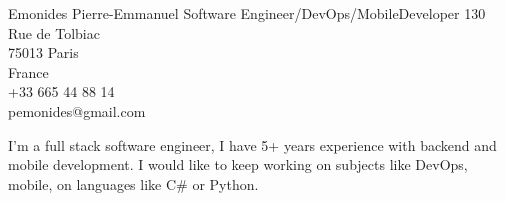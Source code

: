 \documentclass{emonides-cv}
\begin{document}
  
  {Emonides} {Pierre-Emmanuel}
  {Software Engineer/DevOps/MobileDeveloper}
  { 130 Rue de Tolbiac\\
    75013 Paris\\
    France\\
    +33 665 44 88 14\\
    pemonides@gmail.com\\
    }

I'm a full stack software engineer, I have 5+ years experience with backend and mobile development.
I would like to keep working on subjects like DevOps, mobile, on languages like C\# or Python. 
\end{document}
